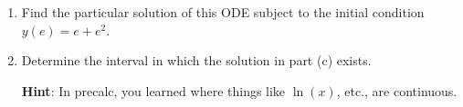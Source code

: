 \documentclass[12 pt]{article}
\newcommand{\hint}[1]{\vspace{3mm}\textbf{Hint}: #1}
\begin{document}
\begin{enumerate}[leftmargin=0in, rightmargin=-0.25in]
\begin{enumerate}[itemsep=1.75in]
		\hint{Use $u$-substitution to find the integrating factor $m(x)$; notice that $p(x)$ has a minus sign; and watch your algebra! There's \textit{lots} of cancellation when finding $m(x)$!}.
		\item Find the particular solution of this ODE subject to the initial condition $y(e)=e+e^2$.
		\item Determine the interval in which the solution in part (c) exists. 
		
		\hint{In precalc, you learned where things like $\ln(x)$, etc., are continuous.}
	\end{enumerate}
\end{enumerate}
\end{document}
